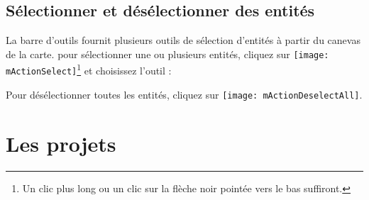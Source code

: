 \subsection{Sélectionner et désélectionner des entités}\label{sec:selection}

La barre d'outils fournit plusieurs outils de sélection d'entités à partir du canevas de la carte. pour sélectionner une ou plusieurs entités, cliquez  sur \texttt{[image: mActionSelect]}\footnote{Un clic plus long ou un clic sur la flèche noir pointée vers le bas suffiront.} et choisissez l'outil :

\begin{description}
\item {}
\item {}
\item {}
\item {}
\item {}
\end{description} 

Pour désélectionner toutes les entités, cliquez sur \texttt{[image: mActionDeselectAll]}.

\section{Les projets} \label{sec:projects} 

